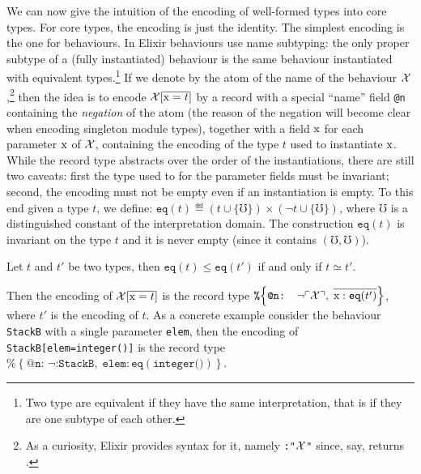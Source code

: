 \documentclass[a4paper,10pt]{article}
\begin{document}
We can now give the intuition of the encoding of well-formed types into core types. For core types, the encoding is just the identity. The simplest encoding is the one for behaviours. In Elixir behaviours use name subtyping: the only proper subtype of a (fully instantiated) behaviour is the same behaviour instantiated with equivalent types.\footnote{Two type are equivalent if they have the same interpretation, that is if they are one subtype of each other.} If we denote by \atom{\BX} the atom of the name of the behaviour $\mathcal{X}$,\footnote{As a curiosity, Elixir provides syntax for it, namely \texttt{:"$\mathcal{X}$"} since, say,  returns .} then the idea is to encode $\mathcal{X}[\overline{\text{\rm x}=t}]$ by a record with a special ``name'' field \texttt{@n} containing the \emph{negation} of the atom \atom{\BX} (the reason of the negation will become clear when encoding singleton module types), together with a field $\text{\rm x}$ for each parameter $\text{\rm x}$ of $\mathcal{X}$, containing the encoding of the type $t$ used to instantiate $\text{\rm x}$. While the record type abstracts over the order of the instantiations, there are still two caveats: first the type used to for the parameter fields must be invariant; second, the encoding must not be empty even if an instantiation is empty. To this end given a type $t$, we define: \( \texttt{eq}(t) \eqdef (t\cup\{\mho\})\times (\neg t\cup\{\mho\})\), where $\mho$ is a distinguished constant of the interpretation domain. The construction $\texttt{eq}(t)$ is invariant on the type $t$ and it is never empty (since  it contains $(\mho,\mho)$). 
\begin{lemma}
Let $t$ and $t'$ be two types, then $\texttt{eq}(t)\leq\texttt{eq}(t')$ if and only if $t\simeq t'$.
\end{lemma}
Then the encoding of $\mathcal{X}[\overline{\text{\rm x}=t}]$ is the record type $\texttt{\%}\!\left\{\texttt{@n: $\neg\ulcorner\mathcal{X}\urcorner$},\;\overline{\text{\rm x}:\texttt{eq}(t')}\right\}$, where $t'$ is the encoding of $t$. As a concrete example consider the behaviour \texttt{StackB} with a single parameter \texttt{elem}, then the encoding of \texttt{StackB[elem=integer()]} is the record type $\texttt{\%}\!\left\{\texttt{@n: $\neg$:StackB},\;\texttt{elem}:\texttt{eq}(\texttt{integer()})\right\}$.
\end{document}
